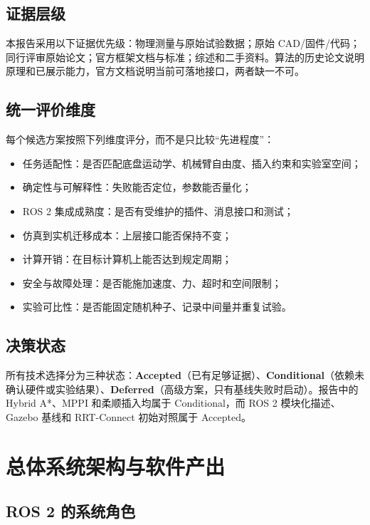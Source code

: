 \documentclass[UTF8,12pt,oneside]{ctexrep}
\begin{document}
\section{证据层级}

本报告采用以下证据优先级：物理测量与原始试验数据；原始 CAD/固件/代码；同行评审原始论文；官方框架文档与标准；综述和二手资料。算法的历史论文说明原理和已展示能力，官方文档说明当前可落地接口，两者缺一不可。

\section{统一评价维度}

每个候选方案按照下列维度评分，而不是只比较“先进程度”：

\begin{itemize}
  \item 任务适配性：是否匹配底盘运动学、机械臂自由度、插入约束和实验室空间；
  \item 确定性与可解释性：失败能否定位，参数能否量化；
  \item ROS 2 集成成熟度：是否有受维护的插件、消息接口和测试；
  \item 仿真到实机迁移成本：上层接口能否保持不变；
  \item 计算开销：在目标计算机上能否达到规定周期；
  \item 安全与故障处理：是否能施加速度、力、超时和空间限制；
  \item 实验可比性：是否能固定随机种子、记录中间量并重复试验。
\end{itemize}

\section{决策状态}

所有技术选择分为三种状态：\textbf{Accepted}（已有足够证据）、\textbf{Conditional}（依赖未确认硬件或实验结果）、\textbf{Deferred}（高级方案，只有基线失败时启动）。报告中的 Hybrid A*、MPPI 和柔顺插入均属于 Conditional，而 ROS 2 模块化描述、Gazebo 基线和 RRT-Connect 初始对照属于 Accepted。

\chapter{总体系统架构与软件产出}

\section{ROS 2 的系统角色}
\end{document}

